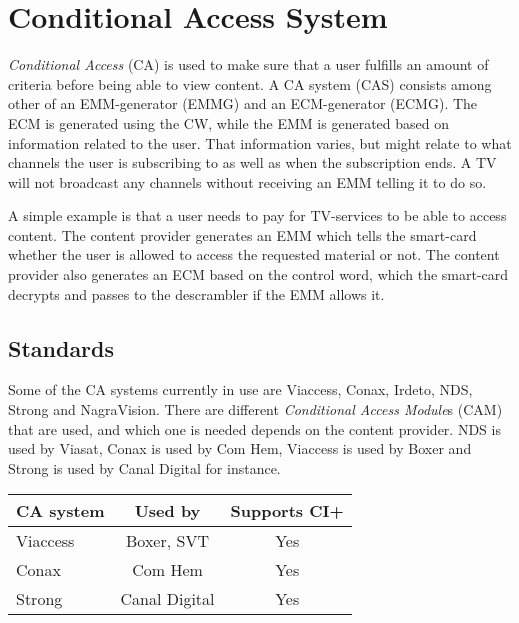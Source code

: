 \section{Conditional Access System} \label{sec:CAS}
\emph{Conditional Access} (CA) is used to make sure that a user 
fulfills an amount of criteria before being able to view content. A 
CA system (CAS) consists among other of an EMM-generator (EMMG) and an 
ECM-generator (ECMG). %
The ECM is generated using the CW, while the EMM is generated based on 
information related to the user. That information varies, but might 
relate to what channels the user is subscribing to as well as when the 
subscription ends. A TV will not broadcast any channels without 
receiving an EMM telling it to do so.

A simple example is that a user needs to pay for TV-services to be able 
to access content. The content provider generates an EMM which tells 
the smart-card whether the user is allowed to access the requested 
material or not. The content provider also generates an ECM based on 
the control word, which the smart-card decrypts and passes to the 
descrambler if the EMM allows it.

\subsection{Standards}
Some of the CA systems currently in use are Viaccess, Conax, Irdeto, NDS, Strong 
and NagraVision. There are different \emph{Conditional Access Module}s (CAM) 
that are used, and which one is needed depends on the content provider. NDS is 
used by Viasat, Conax is used by Com Hem, Viaccess is used by Boxer and Strong 
is used by Canal Digital for instance.

\begin{longtable}{| l | c | c |}
  \hline
  CA system & Used by & Supports CI+ \\ \hline
  
  Viaccess & Boxer, SVT & Yes \\ \hline
  Conax & Com Hem & Yes \\ \hline
  Strong & Canal Digital & Yes \\ \hline
\end{longtable}



